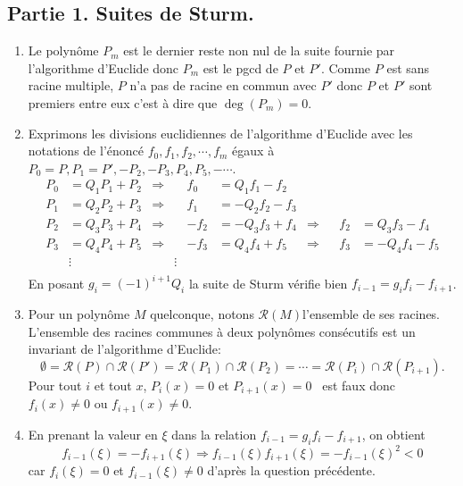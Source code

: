 \subsection*{Partie 1. Suites de Sturm.}
\begin{enumerate}
  \item Le polynôme $P_m$ est le dernier reste non nul de la suite fournie par l'algorithme d'Euclide donc $P_m$ est le pgcd de $P$ et $P'$. Comme $P$ est sans racine multiple, $P$ n'a pas de racine en commun avec $P'$ donc $P$ et $P'$ sont premiers entre eux c'est à dire que $\deg(P_m) = 0$.
  
  \item Exprimons les divisions euclidiennes de l'algorithme d'Euclide avec les notations de l'énoncé $f_0, f_1, f_2, \cdots, f_m$ égaux à $P_0 = P, P_1 = P', -P_2, -P_3, P_4, P_5, - \cdots $.
\[
  \begin{aligned}
    P_0 &= Q_1 P_1 + P_2 &\Rightarrow&   &f_0 &= Q_1 f_1 - f_2  \\
    P_1 &= Q_2 P_2 + P_3 &\Rightarrow&  &f_1 &= -Q_2 f_2 - f_3 \\
    P_2 &= Q_3 P_3 + P_4 &\Rightarrow&  &-f_2 &= -Q_3 f_3 + f_4 &\Rightarrow&  &f_2 &= Q_3 f_3 - f_4\\
    P_3 &= Q_4 P_4 + P_5 &\Rightarrow&  &-f_3 &= Q_4 f_4 + f_5 &\Rightarrow&  &f_3 &= -Q_4 f_4 - f_5\\
        &\vdots          &      &\vdots& \\
  \end{aligned}
\]
En posant $g_i = (-1)^{i+1} Q_i$ la suite de Sturm vérifie bien $f_{i-1} = g_i f_i - f_{i+1}$.

  \item Pour un polynôme $M$ quelconque, notons $\mathcal{R}(M)$l'ensemble de ses racines. L'ensemble des racines communes à deux polynômes consécutifs est un invariant de l'algorithme d'Euclide:
\[
  \emptyset = \mathcal{R}(P)\cap \mathcal{R}(P') = \mathcal{R}(P_1)\cap \mathcal{R}(P_2)= \cdots = \mathcal{R}(P_i)\cap \mathcal{R}(P_{i+1}).
\]
Pour tout $i$ et tout $x$, \og $P_i(x)= 0$ et $P_{i+1}(x) = 0$\fg~ est faux donc $f_i(x) \neq 0$ ou $f_{i+1}(x) \neq 0$.

  \item En prenant la valeur en $\xi$ dans la relation $f_{i-1} = g_if_i - f_{i+1}$, on obtient 
\[  
  f_{i-1}(\xi) = -f_{i+1}(\xi) \Rightarrow f_{i-1}(\xi)f_{i+1}(\xi) = - f_{i-1}(\xi)^2 < 0
\]
car $f_i(\xi) = 0$ et $f_{i-1}(\xi) \neq 0$ d'après la question précédente.
\end{enumerate}

